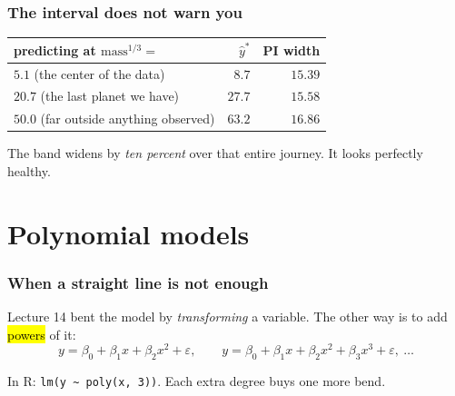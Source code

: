 \documentclass[slidestop,compress,mathserif]{beamer}
\begin{document}
\begin{frame}
\frametitle{The interval does not warn you}

{\small
\begin{center}
\begin{tabular}{@{}lrr@{}}
\toprule
predicting at $\text{mass}^{1/3} =$ & $\hat y^\ast$ & PI width \\
\midrule
$5.1$ \quad (the center of the data) & $8.7$ & $15.39$ \\
$20.7$ \quad (the last planet we have) & $27.7$ & $15.58$ \\
$50.0$ \quad (far outside anything observed) & $63.2$ & $16.86$ \\
\bottomrule
\end{tabular}
\end{center}}

\pause
\vspace{0.2em}
The band widens by \emph{ten percent} over that entire journey. It looks perfectly healthy.

\pause
\vspace{0.2em}

\end{frame}


\section{Polynomial models}
\begin{frame}
\frametitle{When a straight line is not enough}

Lecture 14 bent the model by \emph{transforming} a variable. The other way is to add \hl{powers} of it:
$$y = \beta_0 + \beta_1 x + \beta_2 x^2 + \varepsilon, \qquad y = \beta_0 + \beta_1 x + \beta_2 x^2 + \beta_3 x^3 + \varepsilon, \ \ldots$$

\pause
\vspace{0.3em}

\pause
\vspace{0.2em}
{\small In R: \texttt{lm(y \textasciitilde{} poly(x, 3))}. Each extra degree buys one more bend.}

\end{frame}
\end{document}
